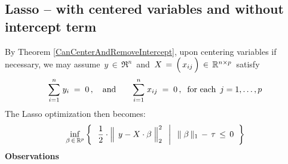 \subsection{Lasso -- with centered variables and without intercept term}
\vskip 0.0cm
\noindent
By Theorem \ref{CanCenterAndRemoveIntercept}, upon centering variables if necessary,
we may assume \,$y \,\in\, \Re^{n}$\, and
\,$X \,=\, \left(\,\overset{{\color{white}-}}{x_{ij}}\,\right) \,\in\, \Re^{n \times p}$\,
satisfy
\begin{equation*}
\overset{n}{\underset{i=1}{\sum}}\;y_{i} \; = \; 0\,,
\quad\textnormal{and}\quad\quad
\overset{n}{\underset{i=1}{\sum}}\;x_{ij} \; = \; 0\,,
\;\;
\textnormal{for each \,$j = 1,\ldots,p$}
\end{equation*}
The Lasso optimization then becomes:
\begin{equation}
\label{LassoCenteredVariablesNoIntercept}
	\underset{\beta\,\in\,\Re^{p}}{\inf}
	\left\{\;\;
		\left.
		\dfrac{1}{2}
		\cdot
		\left\Vert\;\, y \overset{{\color{white}.}}{-} X\cdot\beta \;\right\Vert_{2}^{2}
		\;\;\,\right\vert\;\;
		\Vert\;\beta\,\Vert_{1} \, - \, \tau \, \leq \, 0
		\;\;\right\}
\end{equation}
\textbf{Observations}
